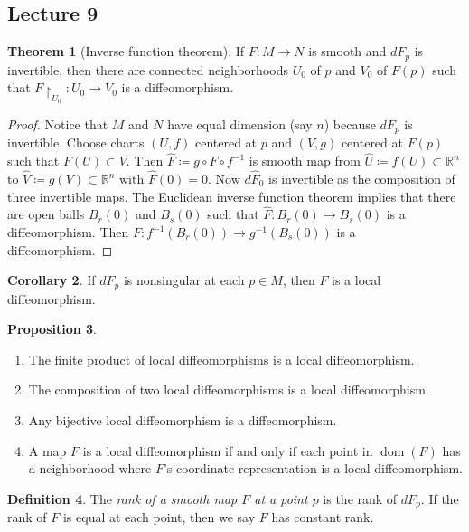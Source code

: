 \documentclass[10pt,letterpaper,cm]{nupset}
\theoremstyle{definition}
\newtheorem{definition}{Definition}[subsection]
\theoremstyle{theorem}
\newtheorem{theorem}[definition]{Theorem}
\newtheorem{prop}[definition]{Proposition}
\newtheorem{corollary}[definition]{Corollary}
\theoremstyle{remark}
\newcommand{\R}{\mathbb R}
\newcommand{\1}{\mathbf{1}}
\newcommand{\0}{\vec 0}
\DeclareMathOperator{\dom}{dom}
\begin{document}
\subsection{Lecture 9}

\begin{theorem}[Inverse function theorem]
If $F: M \to N$ is smooth and $dF_p$ is invertible, then there are connected neighborhoods  $U_0$ of $p$ and $V_0$ of $F(p)$ such that $F\restriction_{U_0}: U_0 \to V_0$ is a diffeomorphism.
\end{theorem}
\begin{proof}
Notice that $M$ and $N$ have equal dimension (say $n$) because $dF_p$ is invertible. Choose charts $(U, f)$ centered at $p$ and $(V, g)$ centered at $F(p)$ such that $F(U) \subset V$. Then $\widehat{F}\coloneqq  g \circ F \circ f^{-1}$ is smooth map from $\widehat{U}\coloneqq f(U)\subset \R^n$ to $\widehat{V}\coloneqq g(V)\subset \R^n$ with $\widehat{F}(0) =0$. Now $d\widehat{F}_0$ is invertible as the composition of three invertible maps. The Euclidean inverse function theorem implies that there are open balls $B_{r}(0)$ and $B_s(0)$ such that $\widehat{F} : B_r(0) \to B_s(0)$ is a diffeomorphism. Then $F: f^{-1}(B_r(0)) \to g^{-1}(B_s(0))$ is a diffeomorphism.
\end{proof}

\begin{corollary}
If $dF_p$ is nonsingular at each $p\in M$, then $F$ is a local diffeomorphism.
\end{corollary}

\begin{prop} $ $
\begin{enumerate}
\item The finite product of local diffeomorphisms is a local diffeomorphism.
\item The composition of two local diffeomorphisms is a local diffeomorphism.
\item Any bijective local diffeomorphism is a diffeomorphism.
\item A map $F$ is a local diffeomorphism if and only if each point in $\dom(F)$ has a neighborhood where $F$'s coordinate representation is a local diffeomorphism.
\end{enumerate}
\end{prop}

\begin{definition}
The \textit{rank of a smooth map $F$ at a point $p$} is the rank of $dF_p$. If the rank of $F$ is equal at each point, then we say $F$ has constant rank.
\end{definition}
\end{document}
